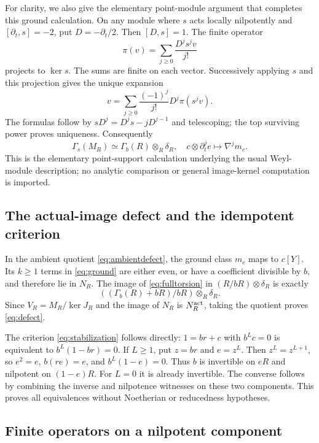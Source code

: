 \documentclass[11pt]{article}
\theoremstyle{definition}\newtheorem{definition}[theorem]{Definition}
\theoremstyle{remark}\newtheorem{remark}[theorem]{Remark}
\begin{document}
For clarity, we also give the elementary point-module argument
that completes this ground calculation. On any module where
$s$ acts locally nilpotently and $[\partial_t,s]=-2$, put
$D=-\partial_t/2$. Then $[D,s]=1$. The finite operator
\[
 \pi(v)=\sum_{j\ge0}\frac{D^js^jv}{j!}
\]
projects to $\ker s$. The sums are finite on each vector.
Successively applying $s$ and this projection gives the unique
expansion
\[
 v=\sum_{j\ge0}\frac{(-1)^j}{j!}D^j\pi(s^jv).
\]
The formulas follow by $sD^j=D^js-jD^{j-1}$ and telescoping;
the top surviving power proves uniqueness. Consequently
\begin{equation}\label{eq:fulltorsion}
 \Gamma_s(M_R)\simeq\Gamma_b(R)\otimes_R\delta_R,
 \quad c\otimes\partial_t^je\longmapsto\nabla^jm_c.
\end{equation}
This is the elementary point-support calculation underlying the
usual Weyl-module description; no analytic comparison or
general image-kernel computation is imported.

\subsection{The actual-image defect and the idempotent criterion}

In the ambient quotient \eqref{eq:ambientdefect}, the ground
class $m_c$ maps to $c[Y]$. Its $k\ge1$ terms in
\eqref{eq:ground} are either even, or have a coefficient
divisible by $b$, and therefore lie in $N_R$.
The image of \eqref{eq:fulltorsion} in
$(R/bR)\otimes\delta_R$ is exactly
\[
 ((\Gamma_b(R)+bR)/bR)\otimes_R\delta_R.
\]
Since $V_R=M_R/\ker J_R$ and the image of $N_R$ is
$N_R^{\rm act}$, taking the quotient proves
\eqref{eq:defect}.

The criterion \eqref{eq:stabilization} follows directly:
$1=br+c$ with $b^Lc=0$ is equivalent to
$b^L(1-br)=0$. If $L\ge1$, put $z=br$ and $e=z^L$.
Then $z^L=z^{L+1}$, so $e^2=e$, $b(re)=e$, and
$b^L(1-e)=0$. Thus $b$ is invertible on $eR$ and nilpotent
on $(1-e)R$. For $L=0$ it is already invertible. The converse
follows by combining the inverse and nilpotence witnesses on
these two components. This proves all equivalences without
Noetherian or reducedness hypotheses.

\subsection{Finite operators on a nilpotent component}
\end{document}
